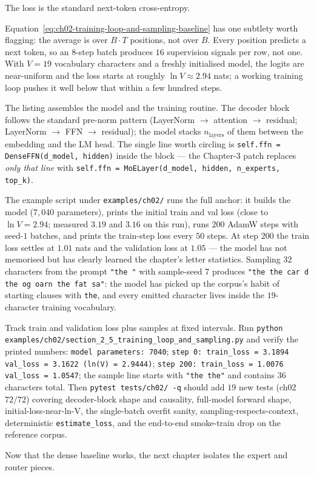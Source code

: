 

The loss is the standard next-token cross-entropy.



Equation~\ref{eq:ch02-training-loop-and-sampling-baseline} has one subtlety worth flagging: the average is over $B \cdot T$ positions, not over $B$. Every position predicts a next token, so an $8$-step batch produces $16$ supervision signals per row, not one. With $V = 19$ vocabulary characters and a freshly initialised model, the logits are near-uniform and the loss starts at roughly $\ln V \approx 2.94$ nats; a working training loop pushes it well below that within a few hundred steps.

The listing assembles the model and the training routine. The decoder block follows the standard pre-norm pattern (LayerNorm $\to$ attention $\to$ residual; LayerNorm $\to$ FFN $\to$ residual); the model stacks $n_{\text{layers}}$ of them between the embedding and the LM head. The single line worth circling is \texttt{self.ffn = DenseFFN(d\_model, hidden)} inside the block --- the Chapter-3 patch replaces \emph{only that line} with \texttt{self.ffn = MoELayer(d\_model, hidden, n\_experts, top\_k)}.



The example script under \texttt{examples/ch02/} runs the full anchor: it builds the model ($7{,}040$ parameters), prints the initial train and val loss (close to $\ln V = 2.94$; measured $3.19$ and $3.16$ on this run), runs $200$ AdamW steps with seed-$1$ batches, and prints the train-step loss every $50$ steps. At step $200$ the train loss settles at $1.01$ nats and the validation loss at $1.05$ --- the model has not memorised but has clearly learned the chapter's letter statistics. Sampling $32$ characters from the prompt \texttt{"the "} with sample-seed $7$ produces \texttt{"the the car d the og oarn the fat sa"}: the model has picked up the corpus's habit of starting clauses with \texttt{the}, and every emitted character lives inside the $19$-character training vocabulary.

\begin{checkpointbox}
Track train and validation loss plus samples at fixed intervals. Run \texttt{python examples/ch02/section\_2\_5\_training\_loop\_and\_sampling.py} and verify the printed numbers: \texttt{model parameters: 7040}; \texttt{step 0: train\_loss = 3.1894    val\_loss = 3.1622    (ln(V) = 2.9444)}; \texttt{step 200: train\_loss = 1.0076    val\_loss = 1.0547}; the sample line starts with \texttt{"the the"} and contains $36$ characters total. Then \texttt{pytest tests/ch02/ -q} should add $19$ new tests (ch02 $72/72$) covering decoder-block shape and causality, full-model forward shape, initial-loss-near-ln-V, the single-batch overfit sanity, sampling-respects-context, deterministic \texttt{estimate\_loss}, and the end-to-end smoke-train drop on the reference corpus.
\end{checkpointbox}

Now that the dense baseline works, the next chapter isolates the expert and router pieces.
